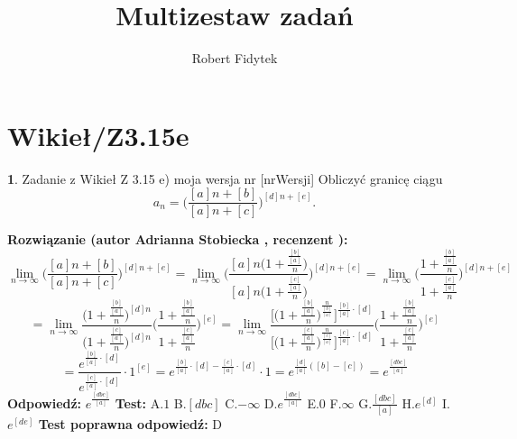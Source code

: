 \documentclass[12pt, a4paper]{article}
\title{Multizestaw zadań}
\author{Robert Fidytek}
\date{}
\theoremstyle{definition} %
\newtheorem{zad}{}
\newcommand{\kategoria}[1]{\section{#1}} %
\newcommand{\zadStart}[1]{\begin{zad}#1\newline} %
\newcommand{\zadStop}{\end{zad}}   %
\newcommand{\rozwStart}[2]{\noindent \textbf{Rozwiązanie (autor #1 , recenzent #2): }\newline} %
\newcommand{\rozwStop}{\newline}                                            %
\newcommand{\odpStart}{\noindent \textbf{Odpowiedź:}\newline}    %
\newcommand{\odpStop}{\newline}                                             %
\newcommand{\testStart}{\noindent \textbf{Test:}\newline} %
\newcommand{\testStop}{\newline} %
\newcommand{\kluczStart}{\noindent \textbf{Test poprawna odpowiedź:}\newline} %
\newcommand{\kluczStop}{\newline} %
\begin{document}
\maketitle


\kategoria{Wikieł/Z3.15e}
\zadStart{Zadanie z Wikieł Z 3.15 e) moja wersja nr [nrWersji]}
Obliczyć granicę ciągu 
$$a_n=\bigg(\frac{[a]n+[b]}{[a]n+[c]}\bigg)^{[d]n+[e]}.$$
\zadStop
\rozwStart{Adrianna Stobiecka}{}
$$\lim_{n\to\infty}\bigg(\frac{[a]n+[b]}{[a]n+[c]}\bigg)^{[d]n+[e]}=\lim_{n\to\infty}\Bigg(\frac{[a]n\big(1+\frac{\frac{[b]}{[a]}}{n}\big)}{[a]n\big(1+\frac{\frac{[c]}{[a]}}{n}\big)}\Bigg)^{[d]n+[e]}=\lim_{n\to\infty}\Bigg(\frac{1+\frac{\frac{[b]}{[a]}}{n}}{1+\frac{\frac{[c]}{[a]}}{n}}\Bigg)^{[d]n+[e]}$$
$$=\lim_{n\to\infty}\frac{\big(1+\frac{\frac{[b]}{[a]}}{n}\big)^{[d]n}}{\big(1+\frac{\frac{[c]}{[a]}}{n}\big)^{[d]n}}\Bigg(\frac{1+\frac{\frac{[b]}{[a]}}{n}}{1+\frac{\frac{[c]}{[a]}}{n}}\Bigg)^{[e]}=\lim_{n\to\infty}\frac{\big[\big(1+\frac{\frac{[b]}{[a]}}{n}\big)^{\frac{n}{\frac{[b]}{[a]}}}\big]^{\frac{[b]}{[a]}\cdot[d]}}{\big[\big(1+\frac{\frac{[c]}{[a]}}{n}\big)^{\frac{n}{\frac{[c]}{[a]}}}\big]^{\frac{[c]}{[a]}\cdot[d]}}\Bigg(\frac{1+\frac{\frac{[b]}{[a]}}{n}}{1+\frac{\frac{[c]}{[a]}}{n}}\Bigg)^{[e]}$$
$$=\frac{e^{\frac{[b]}{[a]}\cdot[d]}}{e^{\frac{[c]}{[a]}\cdot[d]}}\cdot1^{[e]}=e^{\frac{[b]}{[a]}\cdot[d]-\frac{[c]}{[a]}\cdot[d]}\cdot1=e^{\frac{[d]}{[a]}([b]-[c])}=e^{\frac{[dbc]}{[a]}}$$
\rozwStop
\odpStart
$e^{\frac{[dbc]}{[a]}}$
\odpStop
\testStart
A.$1$
B.$[dbc]$
C.$-\infty$
D.$e^{\frac{[dbc]}{[a]}}$
E.$0$
F.$\infty$
G.$\frac{[dbc]}{[a]}$
H.$e^{[d]}$
I.$e^{[de]}$
\testStop
\kluczStart
D
\kluczStop
\end{document}
